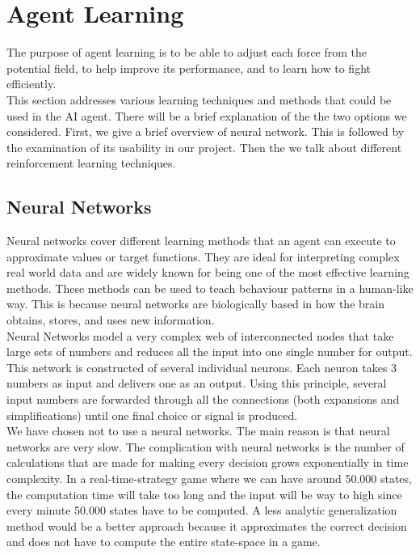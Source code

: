 \section{Agent Learning}\label{agent_learning}
The purpose of agent learning is to be able to adjust each force from the potential field, to help improve its performance, and to learn how to fight efficiently.\\

This section addresses various learning techniques and methods that could be used in the AI agent. There will be a brief explanation of the the two options we considered. First, we give a brief overview of neural network. This is followed by the examination of its usability in our project. Then the we talk about different reinforcement learning techniques. \\

\subsection*{Neural Networks}
Neural networks cover different learning methods that an agent can execute to approximate values or target functions. They are ideal for interpreting complex real world data and are widely known for being one of the most effective learning methods. These methods can be used to teach behaviour patterns in a human-like way. This is because neural networks are biologically based in how the brain obtains, stores, and uses new information.\\


Neural Networks model a very complex web of interconnected nodes that take large sets of numbers and reduces all the input into one single number for output. This network is constructed of several individual neurons. Each neuron takes 3 numbers as input and delivers one as an output. Using this principle, several input numbers are forwarded through all the connections (both expansions and simplifications) until one final choice or signal is produced. \\


We have chosen not to use a neural networks. The main reason is that neural networks are very slow. The complication with neural networks is the number of calculations that are made for making every decision grows exponentially in time complexity. In a real-time-strategy game where we can have around 50.000 states, the computation time will take too long and the input will be way to high since every minute 50.000 states have to be computed. A less analytic generalization method would be a better approach because it approximates the correct decision and does not have to compute the entire state-space in a game. \\


